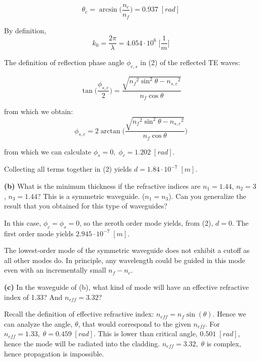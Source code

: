 \documentclass[11pt,a4paper]{article}
\begin{document}
\begin{equation*}
    \theta_c=\arcsin{\Big(\frac{n_c}{n_f}}\Big)=0.937 \;[rad]
\end{equation*}

By definition, 
\begin{equation}
    k_0=\frac{2\pi}{\lambda}=4.054\cdot{10^6} \; \bigg[\frac{1}{m}\bigg]
\end{equation}


The definition of reflection phase angle $\phi_{c,s}$ in (2) of the reflected TE waves:

\begin{equation}
    \tan{\Big(\frac{\phi_{s,c}}{2}\Big)}=\frac{\sqrt{{n_{f}}^2\sin^2{\theta}-{n_{s,c}}^2}}{n_f\cos{\theta}}  
\end{equation}

from which we obtain: 
\begin{equation}
\phi_{s,c}=2\arctan{\Bigg(\frac{\sqrt{{n_{f}}^2\sin^2{\theta}-{n_{s,c}}^2}}{n_f\cos{\theta}}\Bigg)} 
\end{equation}

from which we can calculate $\phi_s=0, \; \phi_c=1.202 \; [rad]$.

Collecting all terms together in (2) yields $d = 1.84\cdot{10^{-7}} \; [m]$.

\begin{displayquote}
    \textbf{(b)} What is the minimum thickness if the refractive indices are $n_1=1.44$, $n_2=3$, $n_3=1.44$? This is a symmetric waveguide. ($n_1=n_3$). Can you generalize the result that you obtained for this type of waveguides?
\end{displayquote}

In this case, $\phi_c=\phi_s=0$, so the zeroth order mode yields, from (2), $d=0$. The first order mode yields $2.945\cdot{10^{-7}} \; [m]$. 

The lowest-order mode of the symmetric waveguide does not exhibit a cutoff as all other modes do. In principle, any wavelength could be guided in this mode even with an incrementally small $n_f-n_c$. 


\begin{displayquote}
    \textbf{(c)} In the waveguide of (b), what kind of mode will have an effective refractive index of 1.33? And $n_{eff}=3.32$?
\end{displayquote}

Recall the definition of effective refractive index: $n_{eff}=n_f\sin{(\theta)}$. Hence we can analyze the angle, $\theta$, that would correspond to the given $n_{eff}$. For $n_{eff}=1.33, \; \theta = 0.459 \; [rad]$. This is lower than critical angle, $0.501 \; [rad]$, hence the mode will be radiated into the cladding. $n_{eff}=3.32, \; \theta$ is complex, hence propagation is impossible. 
\end{document}
